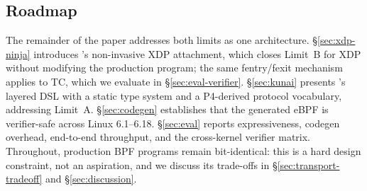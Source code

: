\subsection{Roadmap}
\label{sec:roadmap}

The remainder of the paper addresses both limits as one architecture.
\S\ref{sec:xdp-ninja} introduces \xdpninja's non-invasive XDP attachment,
which closes Limit~B for XDP without modifying the production program;
the same fentry/fexit mechanism applies to TC, which we evaluate in
\S\ref{sec:eval-verifier}. \S\ref{sec:kunai} presents \kunai's
layered DSL with a static type system and a P4-derived protocol
vocabulary, addressing Limit~A. \S\ref{sec:codegen} establishes that
the generated eBPF is verifier-safe across Linux 6.1--6.18.
\S\ref{sec:eval} reports expressiveness, codegen overhead,
end-to-end throughput, and the cross-kernel verifier matrix.
Throughout, production BPF programs remain bit-identical: this is a
hard design constraint, not an aspiration, and we discuss its
trade-offs in \S\ref{sec:transport-tradeoff} and \S\ref{sec:discussion}.

